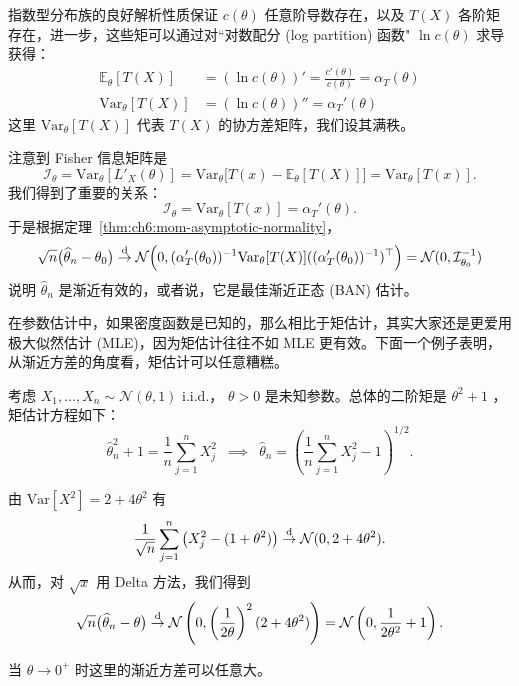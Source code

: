 \begin{remark}
指数型分布族的良好解析性质保证 $c(\theta)$ 任意阶导数存在，以及 $T(X)$ 各阶矩存在，进一步，这些矩可以通过对``对数配分 (log partition) 函数" $\ln c(\theta)$ 求导获得：
\[\begin{aligned} \mathbb{E}_\theta[T(X)]&=(\ln c(\theta))'=\frac{c'(\theta)}{c(\theta)}=\alpha_T(\theta)\\ \mathrm{Var}_\theta[T(X)]&=(\ln c(\theta))''=\alpha_T'(\theta) \end{aligned}\]
这里 $\mathrm{Var}_\theta[T(X)]$ 代表 $T(X)$ 的协方差矩阵，我们设其满秩。

注意到 Fisher 信息矩阵是
\[
\mathcal I_\theta=\mathrm{Var}_\theta[L'_X(\theta)]=\mathrm{Var}_\theta\big[T(x)-\mathbb{E}_\theta[T(X)]\big]=\mathrm{Var}_\theta[T(x)].
\]
我们得到了重要的关系：
\[
\mathcal I_\theta=\mathrm{Var}_\theta[T(x)]=\alpha_T'(\theta).
\]
于是根据定理~\ref{thm:ch6:mom-asymptotic-normality}， \[ \sqrt n\big(\widehat\theta_n-\theta_0\big)\overset{\rm d}\to \mathcal N\Big(0,(\alpha_T'(\theta_0))^{-1}\mathrm{Var}_\theta[T(X)]((\alpha_T'(\theta_0))^{-1})^\top\Big)=\mathcal N(0,\mathcal I^{-1}_{\theta_0}) \]说明 $\widehat\theta_n$ 是渐近有效的，或者说，它是最佳渐近正态 (BAN) 估计。


在参数估计中，如果密度函数是已知的，那么相比于矩估计，其实大家还是更爱用极大似然估计 (MLE)，因为矩估计往往不如 MLE 更有效。下面一个例子表明，从渐近方差的角度看，矩估计可以任意糟糕。

\begin{example}[矩估计可能无定义]
考虑 $X_1,\dots,X_n\sim\mathcal N(\theta,1)$ i.i.d.， $\theta>0$ 是未知参数。总体的二阶矩是 $\theta^2+1$ ，矩估计方程如下：
\[
\widehat\theta_n^2+1=\frac1n\sum_{j=1}^nX_j^2\enspace\implies\enspace \widehat\theta_n=\left(\frac1n\sum_{j=1}^nX_j^2-1\right)^{1/2}.
\]

由 $\mathrm{Var}[X^2]=2+4\theta^2$ 有
\[
\frac1{\sqrt n}\sum_{j=1}^n\big(X_j^2-(1+\theta^2)\big)\overset{\rm d}\to \mathcal N(0,2+4\theta^2).
\]
从而，对 $\sqrt{x}$ 用 Delta 方法，我们得到
\[
\sqrt n\big(\widehat\theta_n-\theta\big)\overset{\rm d}\to \mathcal N\left(0,\left(\frac1{2\theta}\right)^2(2+4\theta^2)\right)=\mathcal N\left(0,\frac{1}{2\theta^2}+1\right).
\]

当 $\theta\to 0^+$ 时这里的渐近方差可以任意大。
\end{example}


\end{remark}
